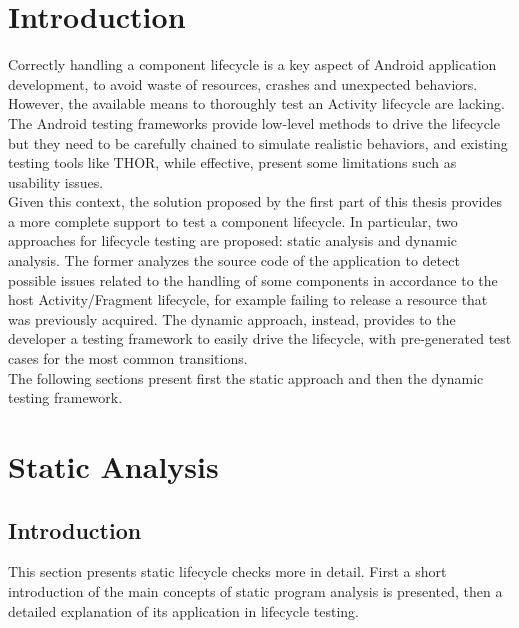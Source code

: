 \documentclass[11pt,a4paper,notitlepage]{article}
\begin{document}
\section{Introduction}
Correctly handling a component lifecycle is a key aspect of Android application development, to avoid waste of resources, crashes and unexpected behaviors.\medskip \\
However, the available means to thoroughly test an Activity lifecycle are lacking. The Android testing frameworks provide low-level methods to drive the lifecycle but they need to be carefully chained to simulate realistic behaviors, and existing testing tools like THOR, while effective, present some limitations such as usability issues.\medskip \\
Given this context, the solution proposed by the first part of this thesis provides a more complete support to test a component lifecycle. In particular, two approaches for lifecycle testing are proposed: static analysis and dynamic analysis. The former analyzes the source code of the application to detect possible issues related to the handling of some components in accordance to the host Activity/Fragment lifecycle, for example failing to release a resource that was previously acquired. The dynamic approach, instead, provides to the developer a testing framework to easily drive the lifecycle, with pre-generated test cases for the most common transitions.\medskip \\
The following sections present first the static approach and then the dynamic testing framework.

\section{Static Analysis}\label{section_lifecycle_static}

\subsection{Introduction}
This section presents static lifecycle checks more in detail. First a short introduction of the main concepts of static program analysis is presented, then a detailed explanation of its application in lifecycle testing.
\end{document}
